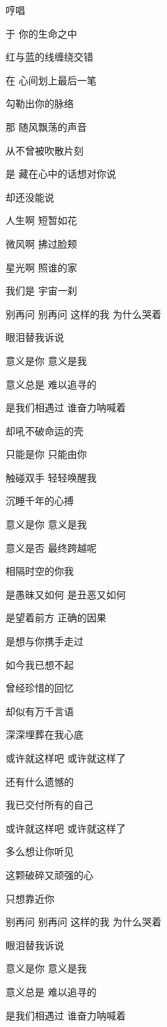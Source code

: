 \documentclass[]{ctexbook}
\begin{document}
哼唱

于 你的生命之中

红与蓝的线缠绕交错

在 心间划上最后一笔

勾勒出你的脉络

那 随风飘荡的声音

从不曾被吹散片刻

是 藏在心中的话想对你说

却还没能说

人生啊 短暂如花

微风啊 拂过脸颊

星光啊 照谁的家

我们是 宇宙一刹

别再问 别再问 这样的我 为什么哭着

眼泪替我诉说

意义是你 意义是我

意义总是 难以追寻的

是我们相遇过 谁奋力呐喊着

却吼不破命运的壳

只能是你 只能由你

触碰双手 轻轻唤醒我

沉睡千年的心搏

意义是你 意义是我

意义是否 最终跨越呢

相隔时空的你我

是愚昧又如何 是丑恶又如何

是望着前方 正确的因果

是想与你携手走过

如今我已想不起

曾经珍惜的回忆

却似有万千言语

深深埋葬在我心底

或许就这样吧 或许就这样了

还有什么遗憾的

我已交付所有的自己

或许就这样吧 或许就这样了

多么想让你听见

这颗破碎又顽强的心

只想靠近你

别再问 别再问 这样的我 为什么哭着

眼泪替我诉说

意义是你 意义是我

意义总是 难以追寻的

是我们相遇过 谁奋力呐喊着
\end{document}

